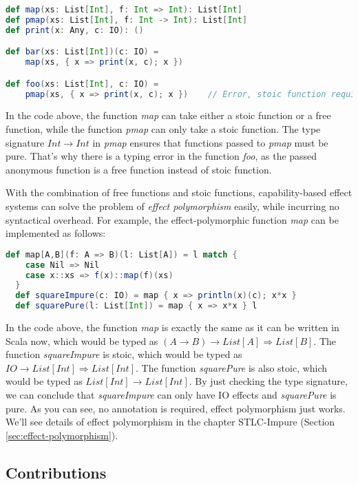 \begin{lstlisting}[language=Scala]
def map(xs: List[Int], f: Int => Int): List[Int]
def pmap(xs: List[Int], f: Int -> Int): List[Int]
def print(x: Any, c: IO): ()

def bar(xs: List[Int])(c: IO) =
    map(xs, { x => print(x, c); x })

def foo(xs: List[Int], c: IO) =
    pmap(xs, { x => print(x, c); x })    // Error, stoic function required
\end{lstlisting}

In the code above, the function \emph{map} can take either a stoic
function or a free function, while the function \emph{pmap} can only
take a stoic function. The type signature $Int \to Int$ in \emph{pmap}
ensures that functions passed to \emph{pmap} must be pure. That's why
there is a typing error in the function \emph{foo}, as the passed
anonymous function is a free function instead of stoic function.

With the combination of free functions and stoic functions,
capability-based effect systems can solve the problem of \emph{effect
  polymorphism} easily, while incurring no syntactical overhead. For
example, the effect-polymorphic function \emph{map} can be implemented
as follows:

\begin{lstlisting}[language=Scala]
  def map[A,B](f: A => B)(l: List[A]) = l match {
    case Nil => Nil
    case x::xs => f(x)::map(f)(xs)
  }
  def squareImpure(c: IO) = map { x => println(x)(c); x*x }
  def squarePure(l: List[Int]) = map { x => x*x } l
\end{lstlisting}

In the code above, the function \emph{map} is exactly the same as it
can be written in Scala now, which would be typed as
$(A \to B) \to List[A] \Rightarrow List[B]$. The function
\emph{squareImpure} is stoic, which would be typed as
$IO \to List[Int] \Rightarrow List[Int]$. The function
\emph{squarePure} is also stoic, which would be typed as
$List[Int] \to List[Int]$. By just checking the type signature, we can
conclude that \emph{squareImpure} can only have IO effects and
\emph{squarePure} is pure. As you can see, no annotation is required,
effect polymorphism just works. We'll see details of effect
polymorphism in the chapter STLC-Impure (Section
\ref{sec:effect-polymorphism}).

\subsection{Contributions}

